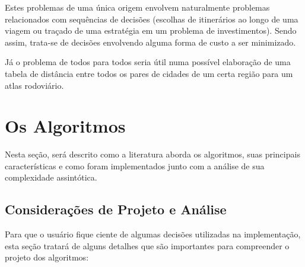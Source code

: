 \documentclass[12pt]{article}
\begin{document}
	Estes problemas de uma única origem envolvem naturalmente problemas relacionados com sequências de decisões (escolhas de itinerários ao longo de uma viagem ou traçado de uma estratégia em um problema de investimentos). Sendo assim, trata-se de decisões envolvendo alguma forma de custo a ser minimizado.
    
    Já o problema de todos para todos seria útil numa possível elaboração de uma tabela de distância entre todos os pares de cidades de um certa região para um atlas rodoviário.



\section{Os Algoritmos}

Nesta seção, será descrito como a literatura aborda os algoritmos, suas principais características e como foram implementados junto com a análise de sua complexidade assintótica.


\subsection{Considerações de Projeto e Análise}

Para que o usuário fique ciente de algumas decisões utilizadas na implementação, esta seção tratará de alguns detalhes que são importantes para compreender o projeto dos algoritmos:
\end{document}
